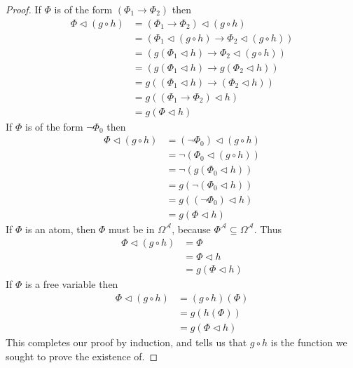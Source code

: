 \documentclass{article}
\begin{document}
\begin{proof}
If $\Phi$ is of the form $(\Phi_1 \rightarrow \Phi_2)$ then
\begin{align*}
   \Phi \lhd (g \circ h)
&= (\Phi_1 \rightarrow \Phi_2) \lhd (g \circ h)                 \\
&= (\Phi_1 \lhd (g \circ h) \rightarrow \Phi_2 \lhd (g \circ h)) \tag{Definition of Assignment} \\
&= (g(\Phi_1 \lhd h) \rightarrow \Phi_2 \lhd (g \circ h))       \tag{Inductive Hypothesis I} \\
&= (g (\Phi_1 \lhd h) \rightarrow g(\Phi_2 \lhd h))            \tag{Inductive Hypothesis II} \\
&= g((\Phi_1 \lhd h) \rightarrow (\Phi_2 \lhd h))              \tag{Definition of $g$} \\
&= g((\Phi_1 \rightarrow \Phi_2) \lhd h)                       \tag{Definition of Assignment} \\
&= g(\Phi \lhd h)
\end{align*}
If $\Phi$ is of the form $\neg \Phi_0$ then
\begin{align*}
\Phi \lhd (g \circ h)
&= (\neg \Phi_0) \lhd (g \circ h) \\
&= \neg (\Phi_0 \lhd (g \circ h)) \tag{Definition of Assignment} \\
&= \neg (g(\Phi_0 \lhd h))       \tag{Inductive Hypothesis} \\
&= g(\neg (\Phi_0 \lhd h))       \tag{Definition of $g$} \\
&= g((\neg \Phi_0) \lhd h)       \tag{Definition of Assignment} \\
&= g(\Phi \lhd h)
\end{align*}
If $\Phi$ is an atom, then $\Phi$ must be in $\Omega^\mathcal{A}$, because $\Phi^\mathcal{A}\subseteq \Omega^\mathcal{A}$.
Thus
\begin{align*}
   \Phi \lhd (g \circ h)
&= \Phi \tag{Definition of Assignment} \\
&= \Phi \lhd h \tag{Definition of Assignment} \\
&= g(\Phi\lhd h) \tag{Definition of $g$}
\end{align*}
If $\Phi$ is a free variable then
\begin{align*}
   \Phi \lhd (g \circ h)
&= (g \circ h)(\Phi) \tag{Definition of Assignment} \\
&= g(h(\Phi)) \\
&= g(\Phi\lhd h) \tag{Definition of Assignment}
\end{align*}
This completes our proof by induction, and tells us that $g\circ h$ is the function we sought to prove the existence of.
\end{proof}
\end{document}
